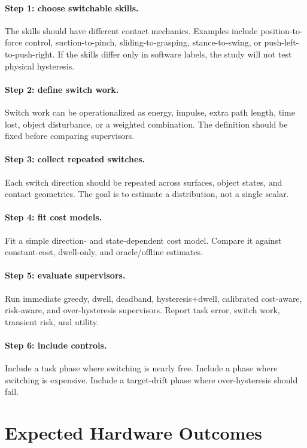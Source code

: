 \documentclass{article}
\begin{document}
\paragraph{Step 1: choose switchable skills.}
The skills should have different contact mechanics.
Examples include position-to-force control, suction-to-pinch, sliding-to-grasping, stance-to-swing, or push-left-to-push-right.
If the skills differ only in software labels, the study will not test physical hysteresis.

\paragraph{Step 2: define switch work.}
Switch work can be operationalized as energy, impulse, extra path length, time lost, object disturbance, or a weighted combination.
The definition should be fixed before comparing supervisors.

\paragraph{Step 3: collect repeated switches.}
Each switch direction should be repeated across surfaces, object states, and contact geometries.
The goal is to estimate a distribution, not a single scalar.

\paragraph{Step 4: fit cost models.}
Fit a simple direction- and state-dependent cost model.
Compare it against constant-cost, dwell-only, and oracle/offline estimates.

\paragraph{Step 5: evaluate supervisors.}
Run immediate greedy, dwell, deadband, hysteresis+dwell, calibrated cost-aware, risk-aware, and over-hysteresis supervisors.
Report task error, switch work, transient risk, and utility.

\paragraph{Step 6: include controls.}
Include a task phase where switching is nearly free.
Include a phase where switching is expensive.
Include a target-drift phase where over-hysteresis should fail.

\section{Expected Hardware Outcomes}
\end{document}
